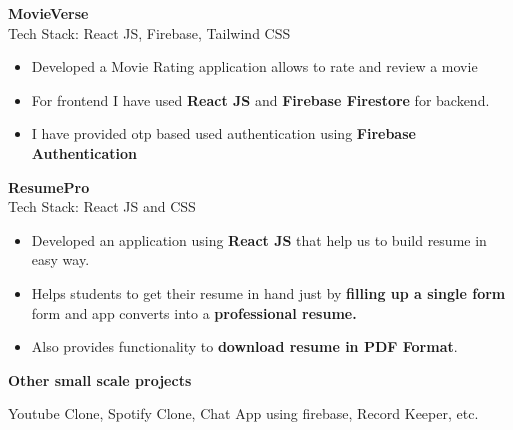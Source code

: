 \documentclass[a4paper]{article}
\begin{document}
{\textbf{MovieVerse}} \hfill \href{https://movieverse-beta.vercel.app/}{\faGlobe[regular]} \
\href{https://github.com/siddheshsurve/movieverse/}{\faGithub}\\
\vspace{1mm}
Tech Stack: React JS, Firebase, Tailwind CSS
\vspace{-1mm}
\begin{itemize} \itemsep 0.5pt
    \item Developed a Movie Rating application allows to rate and review a movie
    \item For frontend I have used \textbf{React JS} and \textbf{Firebase Firestore} for backend.
    \item I have provided otp based used authentication using \textbf{Firebase Authentication}
\end{itemize}
\vspace{2mm}

{\textbf{ResumePro}} \hfill \href{https://resume-builder-iota-one.vercel.app/}{\faGlobe[regular]} \
\href{https://github.com/siddheshsurve/resume-builder}{\faGithub}\\
\vspace{1mm}
Tech Stack: React JS and CSS
\vspace{-1mm}
\begin{itemize} \itemsep 0.5pt
    \item Developed an application using \textbf{React JS} that help us to build resume in easy way.
    \item Helps students to get their resume in hand just by  \textbf{filling up a single form} form and app converts into a  \textbf{professional resume.}
    \item Also provides functionality to \textbf{download resume in PDF Format}.
\end{itemize}
\vspace{2mm}

\textbf{Other small scale projects}\hfill  \href{https://github.com/siddheshsurve}{\faGithub}\\
\vspace{1mm}
\begin{itemize} \itemsep 0.5pt
 Youtube Clone, Spotify Clone, Chat App using firebase, Record Keeper, etc.
\vspace{-1mm}

\end{itemize}
\vspace{4mm}
\end{document}
